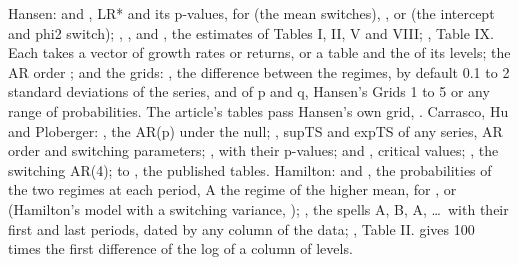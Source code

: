 {\sloppy Hansen:  and , LR* and its p-values, for  (the mean switches), ,  or  (the intercept and phi2 switch); , ,  and , the estimates of Tables I, II, V and VIII; , Table IX. Each takes a vector of growth rates or returns, or a table and the  of its levels; the AR order ; and the grids: , the difference between the regimes, by default 0.1 to 2 standard deviations of the series, and  of p and q, Hansen's Grids 1 to 5 or any range of probabilities. The article's tables pass Hansen's own grid, . Carrasco, Hu and Ploberger: , the AR(p) under the null; , supTS and expTS of any series, AR order and switching parameters; , with their p-values;  and , critical values; , the switching AR(4);  to , the published tables. Hamilton:  and , the probabilities of the two regimes at each period, A the regime of the higher mean, for ,  or  (Hamilton's model with a switching variance, ); , the spells A, B, A, \dots\ with their first and last periods, dated by any column of the data; , Table II.  gives 100 times the first difference of the log of a column of levels.\par}


